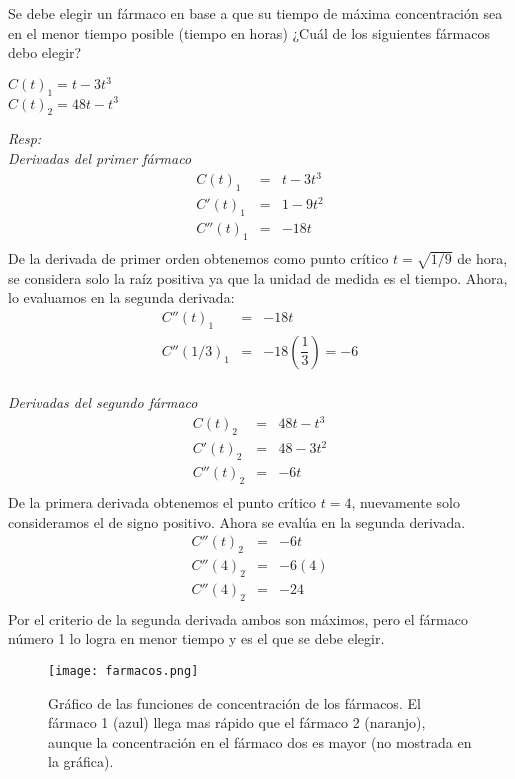 \begin{myexample}
Se debe elegir un fármaco en base a que su tiempo de máxima concentración sea en el menor tiempo posible (tiempo en horas) ¿Cuál de los siguientes fármacos debo elegir?\\
\end{myexample}
\begin{center}
$C(t)_{1}=t-3t^{3}$ \\ $C(t)_{2}=48t-t^{3}$
\end{center}
\textit{Resp:}\\
\emph{Derivadas del primer fármaco}
\begin{eqnarray*}
C(t)_{1}&=&t-3t^{3}\\
C'(t)_{1}&=&1-9t^{2}\\
C''(t)_{1}&=&-18t\\
\end{eqnarray*}
De la derivada de primer orden obtenemos como punto crítico $t=\sqrt{1/9}$ de hora, se considera solo la raíz positiva ya que la unidad de medida es el tiempo. Ahora, lo evaluamos en la segunda derivada:\\
\begin{eqnarray*}
C''(t)_{1}&=&-18t\\
C''(1/3)_{1}&=&-18\left(\dfrac{1}{3}\right)=-6\\
\end{eqnarray*}

\emph{Derivadas del segundo fármaco}
\begin{eqnarray*}
C(t)_{2}&=&48t-t^{3}\\
C'(t)_{2}&=&48-3t^{2}\\
C''(t)_{2}&=&-6t\\
\end{eqnarray*}
De la primera derivada obtenemos el punto crítico $t=4$, nuevamente solo consideramos el de signo positivo. Ahora se evalúa en la segunda derivada.
\begin{eqnarray*}
C''(t)_{2}&=&-6t\\
C''(4)_{2}&=&-6(4)\\
C''(4)_{2}&=&-24\\
\end{eqnarray*}
Por el criterio de la segunda derivada ambos son máximos, pero el fármaco número 1 lo logra en menor tiempo y es el que se debe elegir.\\

 \begin{center}
\begin{figure}[h!]
\centering
\texttt{[image: farmacos.png]}
\caption[Gráfico de las funciones de concentración de los fármacos.]{Gráfico de las funciones de concentración de los fármacos. El fármaco 1 (azul) llega mas rápido que el fármaco 2 (naranjo), aunque la concentración en el fármaco dos es mayor (no mostrada en la gráfica).} \label{farmacos}
\end{figure}
\end{center}

